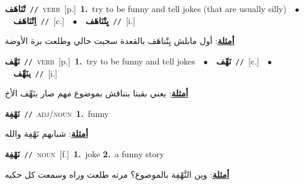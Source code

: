 \documentclass[10pt,a4paper,twoside]{article} %
\begin{document}
\begin{multicols}{2}
{\setlength\topsep{0pt}\textbf{\foreignlanguage{arabic}{تْنَاهَف}}\ {\color{gray}\texttt{//}\color{black}}\ \textsc{verb}\ [p.]\ \textbf{1.}~try to be funny and tell jokes (that are usually silly)\ \ $\bullet$\ \ \setlength\topsep{0pt}\textbf{\foreignlanguage{arabic}{اِتْنَاهَف}}\ {\color{gray}\texttt{//}\color{black}}\ [c.]\ \ $\bullet$\ \ \setlength\topsep{0pt}\textbf{\foreignlanguage{arabic}{يِتْنَاهَف}}\ {\color{gray}\texttt{//}\color{black}}\ [i.]\  \begin{flushright}\color{gray}\foreignlanguage{arabic}{\textbf{\underline{\foreignlanguage{arabic}{أمثلة}}}: أول مابلش يِتْناهَف بالقعدة سحبت حالي وطلعت برة الأوضة}\end{flushright}\color{black}} \vspace{2mm}

{\setlength\topsep{0pt}\textbf{\foreignlanguage{arabic}{نَهَّف}}\ {\color{gray}\texttt{//}\color{black}}\ \textsc{verb}\ [p.]\ \textbf{1.}~try to be funny and tell jokes\ \ $\bullet$\ \ \setlength\topsep{0pt}\textbf{\foreignlanguage{arabic}{نَهِّف}}\ {\color{gray}\texttt{//}\color{black}}\ [c.]\ \ $\bullet$\ \ \setlength\topsep{0pt}\textbf{\foreignlanguage{arabic}{ينَهِّف}}\ {\color{gray}\texttt{//}\color{black}}\ [i.]\  \begin{flushright}\color{gray}\foreignlanguage{arabic}{\textbf{\underline{\foreignlanguage{arabic}{أمثلة}}}: يعني بقينا بنناقش بموضوع مهم صار ينَهِّف الأخ}\end{flushright}\color{black}} \vspace{2mm}

{\setlength\topsep{0pt}\textbf{\foreignlanguage{arabic}{نَهْفِة}}\ {\color{gray}\texttt{//}\color{black}}\ \textsc{adj/noun}\ \textbf{1.}~funny\  \begin{flushright}\color{gray}\foreignlanguage{arabic}{\textbf{\underline{\foreignlanguage{arabic}{أمثلة}}}: شبابهم نَهْفِة والله}\end{flushright}\color{black}} \vspace{2mm}

{\setlength\topsep{0pt}\textbf{\foreignlanguage{arabic}{نَهْفِة}}\ {\color{gray}\texttt{//}\color{black}}\ \textsc{noun}\ [f.]\ \textbf{1.}~joke  \textbf{2.}~a funny story\  \begin{flushright}\color{gray}\foreignlanguage{arabic}{\textbf{\underline{\foreignlanguage{arabic}{أمثلة}}}: وين النَّهْفِة بالموضوع؟ مرته طلعت وراه وسمعت كل حكيه}\end{flushright}\color{black}} \vspace{2mm}


\end{multicols}
\end{document}
